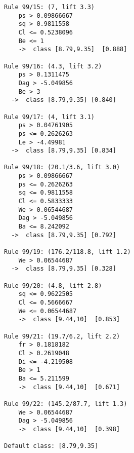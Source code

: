 \begin{tcolorbox}[title=Reglas de clasificación para identificar intervalos de notas.]
\begin{multicols}{3}
\begin{verbatim}
Rule 99/15: (7, lift 3.3)
	ps > 0.09866667
	sq > 0.9811558
	Cl <= 0.5238096
	Be <= 1
	->  class [8.79,9.35]  [0.888]

Rule 99/16: (4.3, lift 3.2)
	ps > 0.1311475
	Dag > -5.049856
	Be > 3
  ->  class [8.79,9.35] [0.840]

Rule 99/17: (4, lift 3.1)
	ps > 0.04761905
	ps <= 0.2626263
	Le > -4.49981
  ->  class [8.79,9.35] [0.834]

Rule 99/18: (20.1/3.6, lift 3.0)
	ps > 0.09866667
	ps <= 0.2626263
	sq <= 0.9811558
	Cl <= 0.5833333
	We > 0.06544687
	Dag > -5.049856
	Ba <= 8.242092
  ->  class [8.79,9.35] [0.792]

Rule 99/19: (176.2/118.8, lift 1.2)
	We > 0.06544687
  ->  class [8.79,9.35] [0.328]

Rule 99/20: (4.8, lift 2.8)
	sq <= 0.9622505
	Cl <= 0.5666667
	We <= 0.06544687
	->  class [9.44,10]  [0.853]

Rule 99/21: (19.7/6.2, lift 2.2)
	fr > 0.1818182
	Cl > 0.2619048
	Di <= -4.219508
	Be > 1
	Ba <= 5.211599
	->  class [9.44,10]  [0.671]

Rule 99/22: (145.2/87.7, lift 1.3)
	We > 0.06544687
	Dag > -5.049856
	->  class [9.44,10]  [0.398]
	
Default class: [8.79,9.35]
    \end{verbatim}
  \end{multicols}
\label{rules7}
\end{tcolorbox}